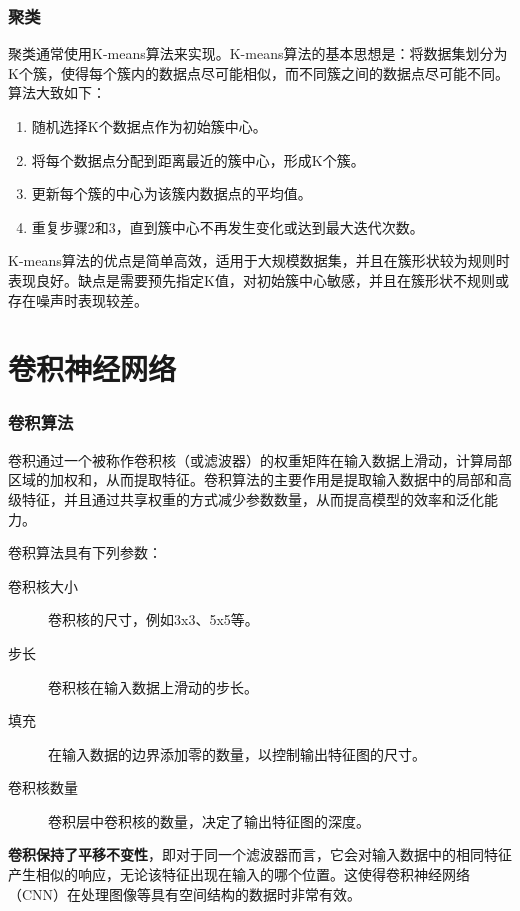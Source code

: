 \documentclass[aspectratio=1610]{ctexbeamer}
\begin{document}
\begin{frame}
    \frametitle{聚类}

    聚类通常使用K-means算法来实现。K-means算法的基本思想是：将数据集划分为K个簇，使得每个簇内的数据点尽可能相似，而不同簇之间的数据点尽可能不同。算法大致如下：
\begin{enumerate}
    \item 随机选择K个数据点作为初始簇中心。
    \item 将每个数据点分配到距离最近的簇中心，形成K个簇。
    \item 更新每个簇的中心为该簇内数据点的平均值。
    \item 重复步骤2和3，直到簇中心不再发生变化或达到最大迭代次数。
\end{enumerate}
    K-means算法的优点是简单高效，适用于大规模数据集，并且在簇形状较为规则时表现良好。缺点是需要预先指定K值，对初始簇中心敏感，并且在簇形状不规则或存在噪声时表现较差。

\end{frame}

\section{卷积神经网络}

\begin{frame}
    \frametitle{卷积算法}

    卷积通过一个被称作卷积核（或滤波器）的权重矩阵在输入数据上滑动，计算局部区域的加权和，从而提取特征。卷积算法的主要作用是提取输入数据中的局部和高级特征，并且通过共享权重的方式减少参数数量，从而提高模型的效率和泛化能力。
    
    卷积算法具有下列参数：
    \begin{description}
        \item[卷积核大小] 卷积核的尺寸，例如3x3、5x5等。
        \item[步长] 卷积核在输入数据上滑动的步长。
        \item[填充] 在输入数据的边界添加零的数量，以控制输出特征图的尺寸。
        \item[卷积核数量] 卷积层中卷积核的数量，决定了输出特征图的深度。
    \end{description}

    \textbf{卷积保持了平移不变性}，即对于同一个滤波器而言，它会对输入数据中的相同特征产生相似的响应，无论该特征出现在输入的哪个位置。这使得卷积神经网络（CNN）在处理图像等具有空间结构的数据时非常有效。

\end{frame}
\end{document}
